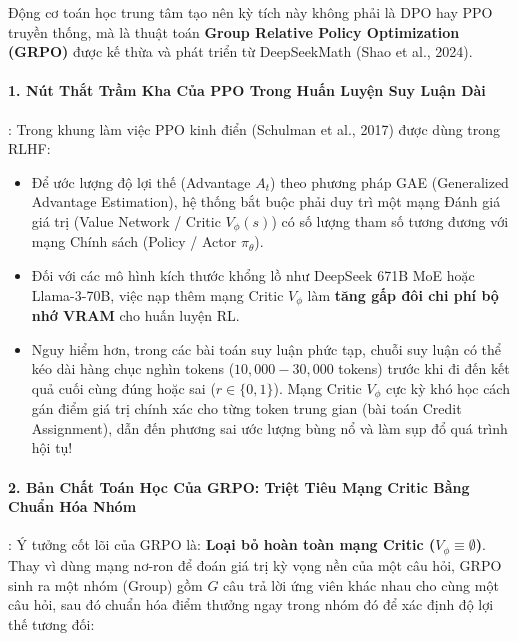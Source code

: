 Động cơ toán học trung tâm tạo nên kỳ tích này không phải là DPO hay PPO truyền thống, mà là thuật toán \textbf{Group Relative Policy Optimization (GRPO)} được kế thừa và phát triển từ DeepSeekMath (Shao et al., 2024).

\paragraph{1. Nút Thắt Trầm Kha Của PPO Trong Huấn Luyện Suy Luận Dài}:
Trong khung làm việc PPO kinh điển (Schulman et al., 2017) được dùng trong RLHF:
\begin{itemize}
  \item Để ước lượng độ lợi thế (Advantage $A_t$) theo phương pháp GAE (Generalized Advantage Estimation), hệ thống bắt buộc phải duy trì một mạng Đánh giá giá trị (Value Network / Critic $V_\phi(s)$) có số lượng tham số tương đương với mạng Chính sách (Policy / Actor $\pi_\theta$).
  \item Đối với các mô hình kích thước khổng lồ như DeepSeek 671B MoE hoặc Llama-3-70B, việc nạp thêm mạng Critic $V_\phi$ làm \textbf{tăng gấp đôi chi phí bộ nhớ VRAM} cho huấn luyện RL.
  \item Nguy hiểm hơn, trong các bài toán suy luận phức tạp, chuỗi suy luận có thể kéo dài hàng chục nghìn tokens ($10{,}000 - 30{,}000$ tokens) trước khi đi đến kết quả cuối cùng đúng hoặc sai ($r \in \{0, 1\}$). Mạng Critic $V_\phi$ cực kỳ khó học cách gán điểm giá trị chính xác cho từng token trung gian (bài toán Credit Assignment), dẫn đến phương sai ước lượng bùng nổ và làm sụp đổ quá trình hội tụ!
\end{itemize}

\paragraph{2. Bản Chất Toán Học Của GRPO: Triệt Tiêu Mạng Critic Bằng Chuẩn Hóa Nhóm}:
Ý tưởng cốt lõi của GRPO là: \textbf{Loại bỏ hoàn toàn mạng Critic ($V_\phi \equiv \emptyset$)}. Thay vì dùng mạng nơ-ron để đoán giá trị kỳ vọng nền của một câu hỏi, GRPO sinh ra một nhóm (Group) gồm $G$ câu trả lời ứng viên khác nhau cho cùng một câu hỏi, sau đó chuẩn hóa điểm thưởng ngay trong nhóm đó để xác định độ lợi thế tương đối:

